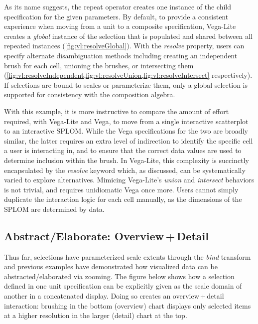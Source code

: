 As its name suggests, the repeat operator creates one instance of the child
specification for the given parameters. By default, to provide a consistent
experience when moving from a unit to a composite specification, Vega-Lite
creates a \emph{global} instance of the selection that is populated and shared
between all repeated instances (\cref{fig:vl:resolveGlobal}). With the
\emph{resolve} property, users can specify alternate disambiguation methods
including creating an independent brush for each cell, unioning the brushes, or
intersecting them
(\cref{fig:vl:resolveIndependent,fig:vl:resolveUnion,fig:vl:resolveIntersect}
respectively). If selections are bound to scales or parameterize them, only a
global selection is supported for consistency with the composition algebra.

With this example, it is more instructive to compare the amount of effort
required, with Vega-Lite and Vega, to move from a single interactive scatterplot
to an interactive SPLOM. While the Vega specifications for the two are broadly
similar, the latter requires an extra level of indirection to identify the
specific cell a user is interacting in, and to ensure that the correct data
values are used to determine inclusion within the brush. In Vega-Lite, this
complexity is succinctly encapsulated by the \emph{resolve} keyword which, as
discussed, can be systematically varied to explore alternatives. Mimicing
Vega-Lite's \emph{union} and \emph{intersect} behaviors is not trivial, and
requires unidiomatic Vega once more. Users cannot simply duplicate the
interaction logic for each cell manually, as the dimensions of the SPLOM are
determined by data.

\vspace{-10pt}

\subsection{Abstract/Elaborate: Overview\,+\,Detail}

\vspace{-7pt}

Thus far, selections have parameterized scale extents through the \emph{bind}
transform and previous examples have demonstrated how visualized data can be
abstracted/elaborated via zooming. The figure below shows how a selection
defined in one unit specification can be explicitly given as the scale domain of
another in a concatenated display. Doing so creates an overview\,+\,detail
interaction: brushing in the bottom (overview) chart displays only selected
items at a higher resolution in the larger (detail) chart at the top.

